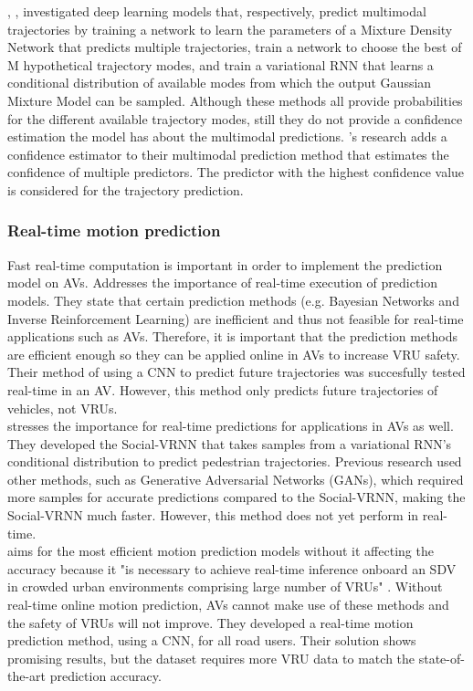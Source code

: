 \cite{rehder2018pedestrian}, \cite{cui2019multimodal}, \cite{brito2020social} investigated deep learning models that, respectively, predict multimodal trajectories by training a network to learn the parameters of a Mixture Density Network that predicts multiple trajectories, train a network to choose the best of M hypothetical trajectory modes, and train a variational RNN that learns a conditional distribution of available modes from which the output Gaussian Mixture Model can be sampled. Although these methods all provide probabilities for the different available trajectory modes, still they do not provide a confidence estimation the model has about the multimodal predictions. \cite{huang2019uncertainty}'s research adds a confidence estimator to their multimodal prediction method that estimates the confidence of multiple predictors. The predictor with the highest confidence value is considered for the trajectory prediction. 

\subsubsection{Real-time motion prediction}
Fast real-time computation is important in order to implement the prediction model on AVs. 
\cite{djuric2020uncertainty} Addresses the importance of real-time execution of prediction models. They state that certain prediction methods (e.g. Bayesian Networks and Inverse Reinforcement Learning) are inefficient and thus not feasible for real-time applications such as AVs. Therefore, it is important that the prediction methods are efficient enough so they can be applied online in AVs to increase VRU safety. Their method of using a CNN to predict future trajectories was succesfully tested real-time in an AV. However, this method only predicts future trajectories of vehicles, not VRUs. \\
\cite{brito2020social} stresses the importance for real-time predictions for applications in AVs as well. They developed the Social-VRNN that takes samples from a variational RNN's conditional distribution to predict pedestrian trajectories. Previous research used other methods, such as Generative Adversarial Networks (GANs), which required more samples for accurate predictions compared to the Social-VRNN, making the Social-VRNN much faster. However, this method does not yet perform in real-time.  \\
\cite{chou2020predicting} aims for the most efficient motion prediction models without it affecting the accuracy because it "is necessary to achieve real-time inference onboard an SDV in crowded urban environments comprising large number of VRUs" \cite{chou2020predicting}. Without real-time online motion prediction, AVs cannot make use of these methods and the safety of VRUs will not improve. They developed a real-time motion prediction method, using a CNN, for all road users. Their solution shows promising results, but the dataset requires more VRU data to match the state-of-the-art prediction accuracy. 

